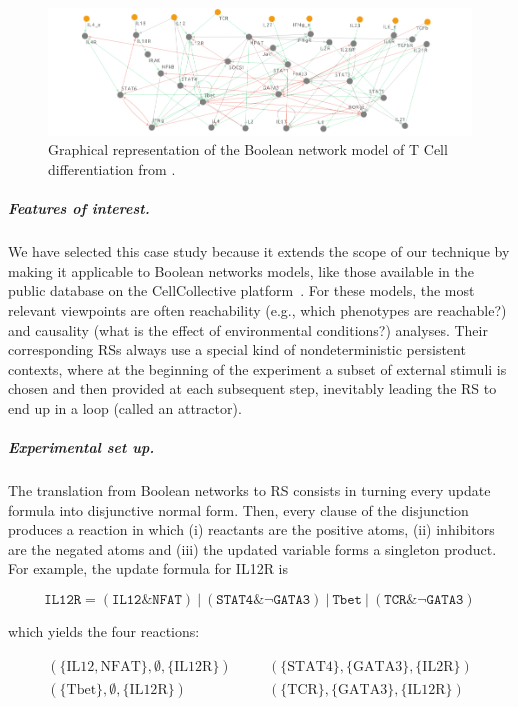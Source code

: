 \begin{figure}[t]
	\begin{center}
		\includegraphics[width=\columnwidth]{figs-datamod2023/Tcell-graph-8set23.png}
	\end{center}
	\caption{Graphical representation of the Boolean network model of T Cell differentiation from \cite{puniya2018mechanistic}.}
	\label{fig:model-graph}
\end{figure}

\subparagraph*{Features of interest.}
We have selected this case study because it extends the scope of our technique by making it applicable to Boolean networks models, like those available in the public database on the CellCollective platform~\cite{helikar2012cell}. 
For these models, the most relevant viewpoints are often reachability (e.g., which phenotypes are reachable?) and causality (what is the effect of environmental conditions?) analyses.
Their corresponding RSs always use a special kind of nondeterministic persistent contexts, where at the beginning of the experiment a subset of external stimuli is chosen and then provided at each subsequent step, inevitably leading the RS to end up in a loop (called an attractor).

\subparagraph*{Experimental set up.}
The translation from Boolean networks to RS consists in turning every update formula into disjunctive normal form. Then, every clause of the disjunction produces a reaction in which (i) reactants are the positive atoms, (ii) inhibitors are the negated atoms and (iii) the updated variable forms a singleton product. For example, the update formula for IL12R is

\begin{footnotesize}
\[
 \mathtt{IL12R} = (\mathtt{IL12} \& \mathtt{NFAT})~|~(\mathtt{STAT4} \& \neg \mathtt{GATA3})~|~ \mathtt{Tbet}~|~(\mathtt{TCR} \& \neg \mathtt{GATA3})
\]
\end{footnotesize}

\noindent
which yields the four reactions:

\begin{footnotesize}
\[
\begin{array}{ccc}
(\{\mathrm{IL12},\mathrm{NFAT}\},\emptyset,\{\mathrm{IL12R}\}) & \quad & (\{\mathrm{STAT4}\},\{\mathrm{GATA3}\},\{\mathrm{IL2R}\}) \\
(\{\mathrm{Tbet}\},\emptyset,\{\mathrm{IL12R}\}) &  \quad & (\{\mathrm{TCR}\},\{\mathrm{GATA3}\},\{\mathrm{IL12R}\}) \\ 
\end{array} 
\]
\end{footnotesize}

